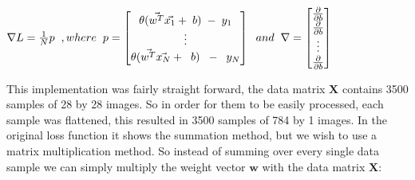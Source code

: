 \documentclass[12pt]{article}
\begin{document}
\begin{center}
  $\nabla L = \frac{1}{N}p \hspace{2mm}, where \hspace{2mm} p = \begin{bmatrix}
      \theta(\vec{w^T}\vec{x_1} + \hspace{1mm}b) \hspace{1mm}-\hspace{1mm}y_1 \\
      \vdots                                                                  \\
      \theta(\vec{w^T}\vec{x_N} + \hspace{2mm}b) \hspace{2mm}-\hspace{2mm}y_N \\
    \end{bmatrix} \hspace{2mm} and \hspace{2mm} \nabla = \begin{bmatrix}
      \frac{\partial}{\partial{b}} \\
      \frac{\partial}{\partial{b}} \\
      \vdots                       \\
      \frac{\partial}{\partial{b}} \\
    \end{bmatrix} $
\end{center}
This implementation was fairly straight forward, the data matrix $\mathbf{X}$ contains 3500 samples of 28 by 28 images.
So in order for them to be easily processed, each sample was flattened, this resulted in 3500 samples of 784 by 1 images.
In the original loss function it shows the summation method, but we wish to use a matrix multiplication method.
So instead of summing over every single data sample we can simply multiply the weight vector $\mathbf{w}$ with the data matrix
$\mathbf{X}$:
\end{document}
